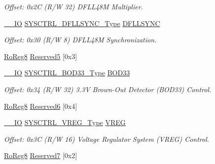 \begin{DoxyCompactItemize}
\begin{DoxyCompactList}\small\item\em Offset\+: 0x2C (R/W 32) D\+F\+L\+L48M Multiplier. \end{DoxyCompactList}\item 
\mbox{\hyperlink{core__cm0plus_8h_aec43007d9998a0a0e01faede4133d6be}{\+\_\+\+\_\+\+IO}} \mbox{\hyperlink{union_s_y_s_c_t_r_l___d_f_l_l_s_y_n_c___type}{S\+Y\+S\+C\+T\+R\+L\+\_\+\+D\+F\+L\+L\+S\+Y\+N\+C\+\_\+\+Type}} \mbox{\hyperlink{struct_sysctrl_a92c0b2513c4e5c8871748ba38cf71691}{D\+F\+L\+L\+S\+Y\+NC}}
\begin{DoxyCompactList}\small\item\em Offset\+: 0x30 (R/W 8) D\+F\+L\+L48M Synchronization. \end{DoxyCompactList}\item 
\mbox{\hyperlink{group___s_a_m_d21_e15_a__definitions_ga0d957f1433aaf5d70e4dc2b68288442d}{Ro\+Reg8}} \mbox{\hyperlink{struct_sysctrl_a033695717f8be7f53c1fb9bf2601212b}{Reserved5}} \mbox{[}0x3\mbox{]}
\item 
\mbox{\hyperlink{core__cm0plus_8h_aec43007d9998a0a0e01faede4133d6be}{\+\_\+\+\_\+\+IO}} \mbox{\hyperlink{union_s_y_s_c_t_r_l___b_o_d33___type}{S\+Y\+S\+C\+T\+R\+L\+\_\+\+B\+O\+D33\+\_\+\+Type}} \mbox{\hyperlink{struct_sysctrl_a889177f83fff9b146ba0946792ca02ac}{B\+O\+D33}}
\begin{DoxyCompactList}\small\item\em Offset\+: 0x34 (R/W 32) 3.\+3V Brown-\/\+Out Detector (B\+O\+D33) Control. \end{DoxyCompactList}\item 
\mbox{\hyperlink{group___s_a_m_d21_e15_a__definitions_ga0d957f1433aaf5d70e4dc2b68288442d}{Ro\+Reg8}} \mbox{\hyperlink{struct_sysctrl_a90ebeceec1a70581f0fc4da2e250e4a6}{Reserved6}} \mbox{[}0x4\mbox{]}
\item 
\mbox{\hyperlink{core__cm0plus_8h_aec43007d9998a0a0e01faede4133d6be}{\+\_\+\+\_\+\+IO}} \mbox{\hyperlink{union_s_y_s_c_t_r_l___v_r_e_g___type}{S\+Y\+S\+C\+T\+R\+L\+\_\+\+V\+R\+E\+G\+\_\+\+Type}} \mbox{\hyperlink{struct_sysctrl_a0197791e83fea741592ef43e5c22e528}{V\+R\+EG}}
\begin{DoxyCompactList}\small\item\em Offset\+: 0x3C (R/W 16) Voltage Regulator System (V\+R\+EG) Control. \end{DoxyCompactList}\item 
\mbox{\hyperlink{group___s_a_m_d21_e15_a__definitions_ga0d957f1433aaf5d70e4dc2b68288442d}{Ro\+Reg8}} \mbox{\hyperlink{struct_sysctrl_a635230c3dfb24d3467a4d50456a3483c}{Reserved7}} \mbox{[}0x2\mbox{]}

\end{DoxyCompactItemize}
